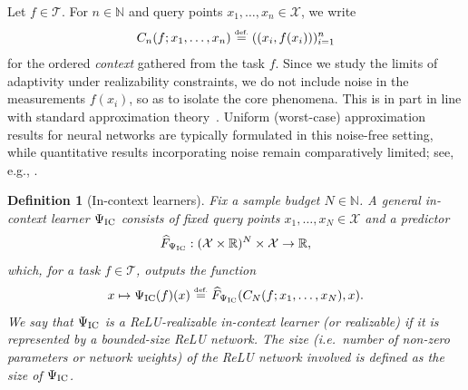 \documentclass{article}
\newtheorem{definition}{Definition}[section]
\newcommand{\eqdef }{\ensuremath{\stackrel{\mbox{\upshape\tiny def.}}{=}}}
\begin{document}
Let $f\in\mathcal T$. For $n\in\mathbb N$ and query points $x_1,\dots,x_n\in\mathcal X$, we write
\[
C_n(f;x_1,\dots,x_n)\eqdef  ((x_i,f(x_i)))_{i=1}^n
\]
for the ordered \emph{context} gathered from the task $f$. 
Since we study the limits of %
adaptivity under realizability constraints, we do not include noise in the measurements $f(x_i)$, so as to isolate the core phenomena.
This is in part in line with standard approximation theory~\cite{yarotsky2017,petersen2018optimal,kratsios2022universal}.
Uniform (worst-case) approximation results for neural networks are typically formulated in this noise-free setting, while quantitative results incorporating noise remain comparatively limited; see, e.g., \cite{kratsios2025beyond}.



\begin{definition}[In-context learners]
Fix a sample budget $N\in\mathbb N$. A \emph{general in-context learner} $\Psi_{\rm IC}$ consists of fixed query points $x_1,\dots,x_N\in\mathcal X$ and a predictor
\[
 \widehat{F}_{\Psi_{\rm IC}}:(\mathcal X\times\mathbb R)^N\times\mathcal X\to\mathbb R,
\]
which, for a task $f\in\mathcal T$, outputs the function
\[
x\mapsto \Psi_{\rm IC}(f)(x) \eqdef 
\widehat{F}_{\Psi_{\rm IC}}
(C_N(f;x_1,\dots,x_N),x).
\]
We say that $\Psi_{\rm IC}$ is a \emph{ReLU-realizable in-context learner} (or \emph{realizable}) if it is represented by a bounded-size ReLU network. 
The size (i.e.\ number of non-zero parameters or network weights) of the ReLU network involved is defined as the size of $\Psi_{\rm IC}$.
\end{definition}
\end{document}
